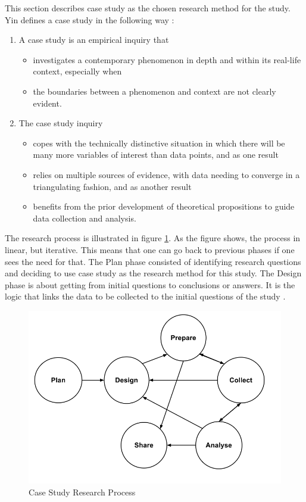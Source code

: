 This section describes case study as the chosen research method for the study. Yin defines a case study in the following way \cite{CaseStudyResearch}:

\begin{enumerate}
\item A case study is an empirical inquiry that
\begin{itemize}
\item investigates a contemporary phenomenon in depth and within its real-life context, especially when
\item the boundaries between a phenomenon and context are not clearly evident.
\end{itemize}
\item The case study inquiry
\begin{itemize}
\item copes with the technically distinctive situation in which there will be many more variables of interest than data points, and as one result
\item relies on multiple sources of evidence, with data needing to converge in a triangulating fashion, and as another result
\item benefits from the prior development of theoretical propositions to guide data collection and analysis.
\end{itemize}
\end{enumerate}

The research process is illustrated in figure \ref{fig:caseProcess}. As the figure shows, the process in linear, but iterative. This means that one can go back to previous phases if one sees the need for that. The Plan phase consisted of identifying research questions and deciding to use case study as the research method for this study. The Design phase is about getting from initial questions to conclusions or answers. It is the logic that links the data to be collected to the initial questions of the study \cite{CaseStudyResearch}. 

\begin{figure}[H]
\begin{center}
\includegraphics[scale=0.38]{caseProcess.png}
\caption[Case Study Research Process]{Case Study Research Process \cite{CaseStudyResearch}}
\label{fig:caseProcess}
\end{center}
\end{figure}

